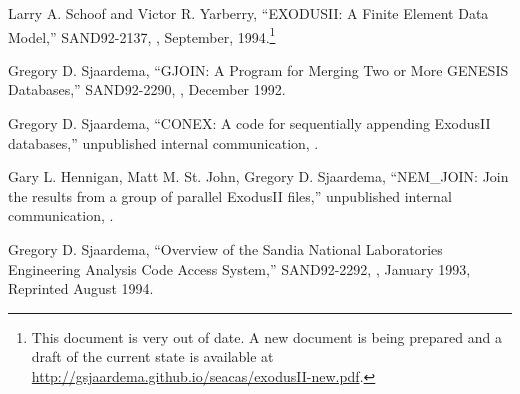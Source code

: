 \begin{thebibliography}{9}

Larry A. Schoof and Victor R. Yarberry,
``EXODUSII: A Finite Element Data Model,''
SAND92-2137,
\SNLA,
September, 1994.\footnote{This document is very out of date.  A new
document is being prepared and a draft of the current state is
available at \url{http://gsjaardema.github.io/seacas/exodusII-new.pdf}.}

Gregory D. Sjaardema,
``GJOIN: A Program for Merging Two or More GENESIS Databases,''
SAND92-2290,
\SNLA,
December 1992.

Gregory D. Sjaardema,
``CONEX: A code for sequentially appending ExodusII databases,''
unpublished internal communication,
\SNLA.

Gary L. Hennigan, Matt M. St. John, Gregory D. Sjaardema,
``NEM\_JOIN: Join the results from a group of parallel ExodusII files,''
unpublished internal communication,
\SNLA.

Gregory D. Sjaardema,
``Overview of the Sandia National Laboratories Engineering Analysis Code Access System,''
SAND92-2292,
\SNLA,
January 1993, Reprinted August 1994.
\end{thebibliography}
